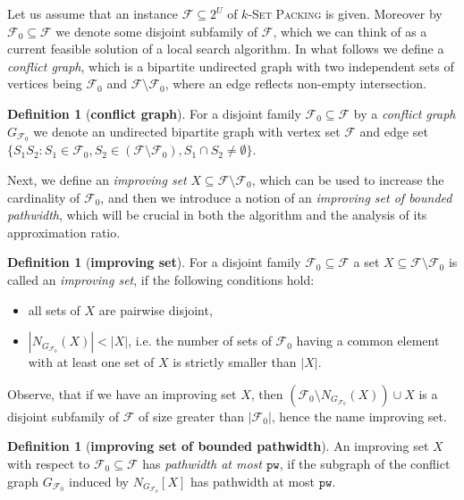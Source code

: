 \documentclass[11pt]{article}
\theoremstyle{definition}
\newtheorem{definition}[theorem]{Definition}
\newcommand{\cF}{{\mathcal{F}}}
\newcommand{\cg}{G_{\cF_0}}
\newcommand{\pw}{\ensuremath{\mathtt{pw}}\xspace}
\newcommand{\kSP}{{\textsc{$k$-Set Packing}}\xspace}
\begin{document}
Let us assume that an instance $\cF \subseteq 2^U$ of \kSP is given.
Moreover by $\cF_0 \subseteq \cF$ we denote some disjoint subfamily of $\cF$,
which we can think of as a current feasible solution of a local search algorithm.
In what follows we define a {\em conflict graph}, which
is a bipartite undirected graph with two independent sets of vertices being $\cF_0$ and $\cF \setminus \cF_0$,
where an edge reflects non-empty intersection.

\begin{definition}[{\bf conflict graph}]
For a disjoint family $\cF_0 \subseteq \cF$ by a {\em conflict graph} $G_{\cF_0}$ we denote
an undirected bipartite graph with vertex set $\cF$ and edge set $\{S_1S_2 : S_1 \in \cF_0, S_2 \in (\cF \setminus \cF_0), S_1 \cap S_2 \neq \emptyset\}$.
\end{definition}

Next, we define an {\em improving set} $X \subseteq \cF \setminus \cF_0$, which
can be used to increase the cardinality of $\cF_0$, and then we introduce 
a notion of an {\em improving set of bounded pathwidth}, which will be crucial in 
both the algorithm and the analysis of its approximation ratio.

\begin{definition}[{\bf improving set}]
\label{def:improving}
For a disjoint family $\cF_0 \subseteq \cF$ a set $X \subseteq \cF \setminus \cF_0$
is called an {\em improving set}, if the following conditions hold:
\begin{itemize}
  \item all sets of $X$ are pairwise disjoint,
  \item $|N_{G_{\cF_0}}(X)| < |X|$, i.e. the number of sets of $\cF_0$ having a common
  element with at least one set of $X$ is strictly smaller than $|X|$.
\end{itemize}
\end{definition}

Observe, that if we have an improving set $X$, then $(\cF_0 \setminus N_{\cg}(X)) \cup X$
is a disjoint subfamily of $\cF$ of size greater than $|\cF_0|$, hence the name improving set.

\begin{definition}[{\bf improving set of bounded pathwidth}]
An improving set $X$ with respect to $\cF_0 \subseteq \cF$ has {\em pathwidth at most $\pw$},
if the subgraph of the conflict graph $G_{\cF_0}$ induced by $N_{\cg}[X]$ has pathwidth at most $\pw$.
\end{definition}
\end{document}

